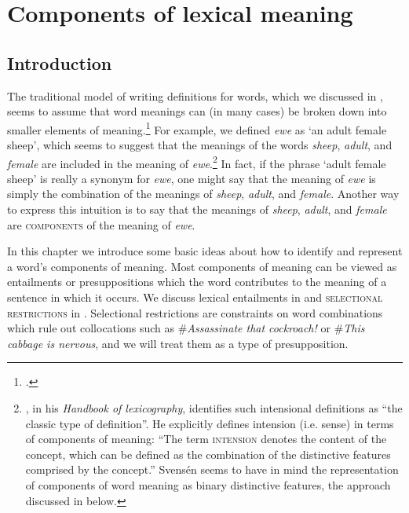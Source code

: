\chapter{Components of lexical meaning}\label{sec:7}

\section{Introduction}\label{sec:7.1}

The traditional model of writing definitions for words, which we discussed in , seems to assume that word meanings can (in many cases) be broken down into smaller elements of meaning.\footnote{\citet[126]{Engelberg2011}.} For example, we defined \textit{ewe} as ‘an adult female sheep’, which seems to suggest that the meanings of the words \textit{sheep}, \textit{adult}, and \textit{female} are included in the meaning of \textit{ewe}.\footnote{\citet[218]{Svensén2009}, in his \textit{Handbook of lexicography}, identifies such intensional definitions as “the classic type of definition”. He explicitly defines intension (i.e. sense) in terms of components of meaning: “The term \textsc{intension} denotes the content of the concept, which can be defined as the combination of the distinctive features comprised by the concept.” Svensén seems to have in mind the representation of components of word meaning as binary distinctive features, the approach discussed in  below.} In fact, if the phrase ‘adult female sheep’ is really a synonym for \textit{ewe}, one might say that the meaning of \textit{ewe} is simply the combination of the meanings of \textit{sheep}, \textit{adult}, and \textit{female}. Another way to express this intuition is to say that the meanings of \textit{sheep}, \textit{adult}, and \textit{female} are \textsc{components} of the meaning of \textit{ewe}.



In this chapter we introduce some basic ideas about how to identify and represent a word’s components of meaning. Most components of meaning can be viewed as entailments or presuppositions which the word contributes to the meaning of a sentence in which it occurs. We discuss lexical entailments in  and \textsc{selectional restrictions} in . Selectional restrictions are constraints on word combinations which rule out collocations such as \#\textit{Assassinate that cockroach!} or \#\textit{This cabbage is nervous}, and we will treat them as a type of presupposition.



